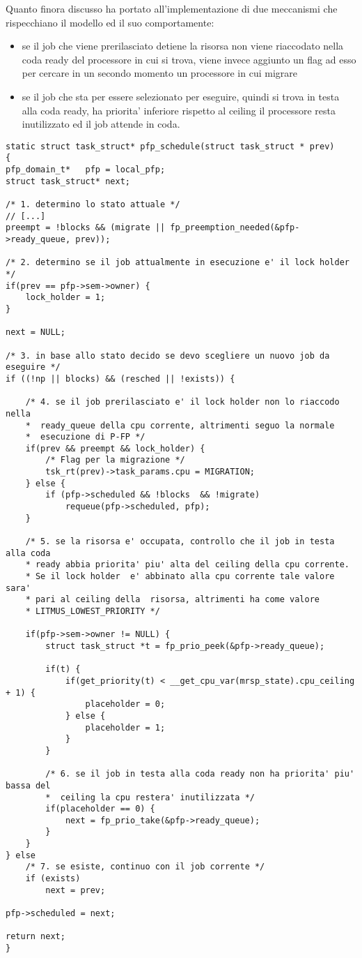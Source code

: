 \documentclass[a4paper,11pt]{article}
\begin{document}
\noindent Quanto finora discusso ha portato all'implementazione di due meccanismi che rispecchiano il modello ed il suo comportamente:

\begin{itemize}
\item se il job che viene prerilasciato detiene la risorsa non viene riaccodato nella coda ready del processore in cui si trova, viene invece aggiunto un flag ad esso per cercare in un secondo momento un processore in cui migrare
\item se il job che sta per essere selezionato per eseguire, quindi si trova in testa alla coda ready, ha priorita' inferiore rispetto al ceiling il processore resta inutilizzato ed il job attende in coda.
\end{itemize}

\begin{lstlisting}
static struct task_struct* pfp_schedule(struct task_struct * prev)
{
pfp_domain_t* 	pfp = local_pfp;
struct task_struct*	next;

/* 1. determino lo stato attuale */
// [...]
preempt = !blocks && (migrate || fp_preemption_needed(&pfp->ready_queue, prev));

/* 2. determino se il job attualmente in esecuzione e' il lock holder */
if(prev == pfp->sem->owner) {
	lock_holder = 1;
}

next = NULL;

/* 3. in base allo stato decido se devo scegliere un nuovo job da eseguire */
if ((!np || blocks) && (resched || !exists)) {

	/* 4. se il job prerilasciato e' il lock holder non lo riaccodo nella
	*  ready_queue della cpu corrente, altrimenti seguo la normale
	*  esecuzione di P-FP */
	if(prev && preempt && lock_holder) {
		/* Flag per la migrazione */
		tsk_rt(prev)->task_params.cpu = MIGRATION;
	} else {
		if (pfp->scheduled && !blocks  && !migrate)
			requeue(pfp->scheduled, pfp);
	}

	/* 5. se la risorsa e' occupata, controllo che il job in testa alla coda 
	* ready abbia priorita' piu' alta del ceiling della cpu corrente.
	* Se il lock holder  e' abbinato alla cpu corrente tale valore sara'
	* pari al ceiling della  risorsa, altrimenti ha come valore 
	* LITMUS_LOWEST_PRIORITY */

	if(pfp->sem->owner != NULL) {
		struct task_struct *t = fp_prio_peek(&pfp->ready_queue);

		if(t) {
			if(get_priority(t) < __get_cpu_var(mrsp_state).cpu_ceiling + 1) {
				placeholder = 0;
			} else {
				placeholder = 1;
			}
		}
		
		/* 6. se il job in testa alla coda ready non ha priorita' piu' bassa del
		*  ceiling la cpu restera' inutilizzata */
		if(placeholder == 0) {
			next = fp_prio_take(&pfp->ready_queue);
		}
	}
} else
	/* 7. se esiste, continuo con il job corrente */
	if (exists)
		next = prev;
	
pfp->scheduled = next;

return next;
}
\end{lstlisting}
\end{document}
